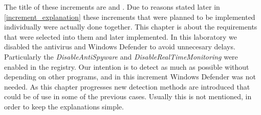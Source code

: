 The title of these increments are \textit{\IncrementoUno} and \textit{\IncrementoDos}. Due to reasons stated later in \ref{increment_explanation} these increments that were planned to be implemented individually were actually done together.
This chapter is about the requirements that were selected into them and later implemented.
\linej
\linej
In this laboratory we disabled the antivirus and Windows Defender to avoid unnecesary delays.
Particularly the \textit{DisableAntiSpyware} and \textit{DisableRealTimeMonitoring} were enabled in the registry.
Our intention is to detect as much as possible without depending on other programs, and in this increment Windows Defender was not needed.
\linej
\linej
As this chapter progresses new detection methods are introduced that could be of use in some of the previous cases.
Usually this is not mentioned, in order to keep the explanations simple.

